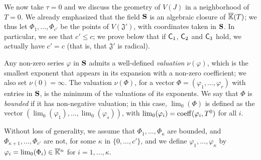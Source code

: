 \documentclass[12pt]{article}
\begin{document}
We now take $\tau=0$ and we discuss the geometry of $V(J)$ in a
neighborhood of $T=0$.  We already emphasized that the field $\mathbf{S}$ is an
algebraic closure of $\overline{\mathbb{K}}(T)$; we thus let $\Phi_1,\dots,\Phi_{c'}$
be the points of $V(\mathfrak{J}')$, with coordinates taken in
$\mathbf{S}$. In particular, we see that $c' \le c$; we prove below that if
$\mathsf{C}_1$, $\mathsf{C}_2$ and $\mathsf{C}_3$ hold, we actually have $c'=c$ (that
is, that $\mathfrak{J}'$ is radical).

Any non-zero series $\varphi$ in $\mathbf{S}$ admits a well-defined {\em
  valuation} $\nu(\varphi)$, which is the smallest exponent that
appears in its expansion with a non-zero coefficient; we also set
$\nu(0)=\infty$. The valuation $\nu(\Phi)$, for a vector
$\Phi=(\varphi_1,\dots,\varphi_r)$ with entries in $\mathbf{S}$, is the
minimum of the valuations of its exponents. We say that $\Phi$ is {\em
  bounded} if it has non-negative valuation; in this case,
$\lim_0(\Phi)$ is defined as the vector
$(\lim_0(\varphi_1),\dots,\lim_0(\varphi_s))$, with
$\lim_0(\varphi_i)={\rm coeff}(\varphi_i,T^0)$ for all $i$.

Without loss of generality, we assume that
$\Phi_1,\dots,\Phi_\kappa$ are bounded, and
$\Phi_{\kappa+1},\dots,\Phi_{c'}$ are not, for some $\kappa$ in
$\{0,\dots,c'\}$, and we define $\varphi_1,\dots,\varphi_\kappa$ by
$\varphi_i=\lim_0(\Phi_i)\in\overline{\mathbb{K}}{}^n$ for
$i=1,\dots,\kappa$.
\end{document}
